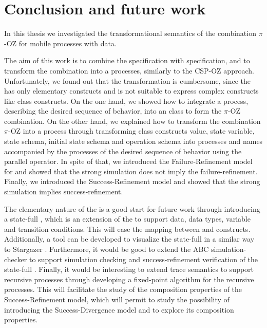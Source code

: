 \chapter{Conclusion and future work}
\label{sec_conclusion}
In this thesis we investigated the transformational semantics of the combination $\pi$-OZ for mobile processes with data.

The aim of this work is to combine the \oz{} specification with \picalc{} specification, and to transform the combination into a \picalc{} processes, similarly to the CSP-OZ \cite{olderog} approach. Unfortunately, we found out that the transformation is cumbersome, since the \picalc{} has only elementary constructs and is not suitable to express complex constructs like \oz{} class constructs. On the one hand, we showed how to integrate a \picalc{} process, describing the desired sequence of behavior, into an \oz{} class to form the $\pi$-OZ combination. On the other hand, we explained how to transform the combination $\pi$-OZ into a \picalc{} process through transforming \oz{} class constructs value, state variable, state schema, initial state schema and operation schema into \picalc{} processes and names accompanied by the processes of the desired sequence of behavior using the parallel operator. In spite of that, we introduced the Failure-Refinement model for \picalc{} and showed that the strong simulation does not imply the failure-refinement. Finally, we introduced the Success-Refinement model and showed that the strong simulation implies success-refinement. 

The elementary nature of the \picalc{} is a good start for future work through introducing a state-full \picalc{}, which is an extension of the \picalc{} to support data, data types, variable and transition conditions. This will ease the mapping between \oz{} and \picalc{} constructs. Additionally, a tool can be developed to visualize the state-full \picalc{} in a similar way to Stargazer \cite{stargazer}. Furthermore, it would be good to extend the ABC simulation-checker \cite{abc} to support simulation checking and success-refinement verification of the state-full \picalc{}. Finally, it would be interesting to extend \cite{gieseking} trace semantics to support recursive processes through developing a fixed-point algorithm for the recursive processes. This will facilitate the study of the composition properties of the Success-Refinement model, which will permit to study the possibility of introducing the Success-Divergence model and to explore its composition properties.

